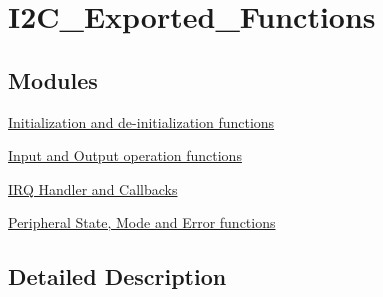 \hypertarget{group___i2_c___exported___functions}{}\section{I2\+C\+\_\+\+Exported\+\_\+\+Functions}
\label{group___i2_c___exported___functions}
\subsection*{Modules}
\begin{DoxyCompactItemize}
\item 
\hyperlink{group___i2_c___exported___functions___group1}{Initialization and de-\/initialization functions}
\item 
\hyperlink{group___i2_c___exported___functions___group2}{Input and Output operation functions}
\item 
\hyperlink{group___i2_c___i_r_q___handler__and___callbacks}{I\+R\+Q Handler and Callbacks}
\item 
\hyperlink{group___i2_c___exported___functions___group3}{Peripheral State, Mode and Error functions}
\end{DoxyCompactItemize}


\subsection{Detailed Description}
